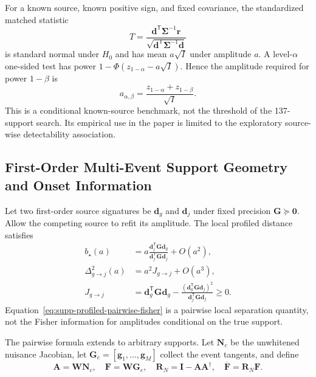 For a known source, known positive sign, and fixed covariance, the standardized matched statistic
\begin{equation}
 T=\frac{\bm d^{\mathsf T}\bm\Sigma^{-1}\bm r}
 {\sqrt{\bm d^{\mathsf T}\bm\Sigma^{-1}\bm d}}
 \label{eq:supp-matched-statistic}
\end{equation}
is standard normal under $H_0$ and has mean $a\sqrt I$ under amplitude $a$. A level-$\alpha$ one-sided test has power
$1-\Phi(z_{1-\alpha}-a\sqrt I)$. Hence the amplitude required for power $1-\beta$ is
\begin{equation}
 a_{\alpha,\beta}
 =\frac{z_{1-\alpha}+z_{1-\beta}}{\sqrt I}.
 \label{eq:supp-detection-amplitude}
\end{equation}
This is a conditional known-source benchmark, not the threshold of the 137-support search. Its empirical use in the paper is limited to the exploratory source-wise detectability association.

\subsection{First-Order Multi-Event Support Geometry and Onset Information}

Let two first-order source signatures be $\bm d_g$ and $\bm d_j$ under fixed precision $\bm G\succeq\bm0$. Allow the competing source to refit its amplitude. The local profiled distance satisfies
\begin{align}
 b_{\star}(a)
 &=a\frac{\bm d_j^{\mathsf T}\bm G\bm d_g}
 {\bm d_j^{\mathsf T}\bm G\bm d_j}+O(a^2),\label{eq:supp-profiled-amplitude}\\
 \Delta_{g\rightarrow j}^2(a)
 &=a^2J_{g\rightarrow j}+O(a^3),\label{eq:supp-profiled-fisher-expansion}\\
 J_{g\rightarrow j}
 &=\bm d_g^{\mathsf T}\bm G\bm d_g
 -\frac{(\bm d_g^{\mathsf T}\bm G\bm d_j)^2}
 {\bm d_j^{\mathsf T}\bm G\bm d_j}\ge0.
 \label{eq:supp-profiled-pairwise-fisher}
\end{align}
Equation~\eqref{eq:supp-profiled-pairwise-fisher} is a pairwise local separation quantity, not the Fisher information for amplitudes conditional on the true support.

The pairwise formula extends to arbitrary supports. Let $\bm N_c$ be the
unwhitened nuisance Jacobian, let $\bm G_e=[\bm g_1,\ldots,\bm g_M]$ collect the
event tangents, and define
\begin{equation}
 \bm A=\bm W\bm N_c,
 \quad \bm F=\bm W\bm G_e,
 \quad \bm R_N=\bm I-\bm A\bm A^{\dagger},
 \quad \overline{\bm F}=\bm R_N\bm F.
 \label{eq:supp-residualized-event-dictionary}
\end{equation}

